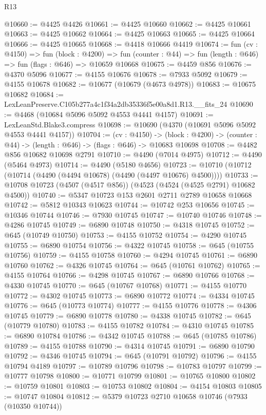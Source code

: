 \begin{lexlean}{R13}
\begin{coremodule}
@10660 := @4425 @4426
@10661 := @4425 @10660
@10662 := @4425 @10661
@10663 := @4425 @10662
@10664 := @4425 @10663
@10665 := @4425 @10664
@10666 := @4425 @10665
@10668 := @4418 @10666 @4419
@10674 := fun (cv : @4150) =>
  fun (block : @4200) =>
  fun (counter : @44) => fun (length : @646) => fun (flags : @646) => @10659 @10668
@10675 := @4459 @856
@10676 := @4370 @5096
@10677 := @4155 @10676
@10678 := @7933 @5092
@10679 := @4155 @10678
@10682 := @10677 (@10679 (@4673 @4978))
@10683 := @10675 @10682
@10684 := LexLeanPreserve.C105b277a4c1f34a2db35336f5e00a8d1.R13.__fits_24
@10690 := @4468 (@10684 @5096 @5092 @4553 @4441 @4157)
@10691 := LexLeanStd.Blake3.compress
@10698 := @10690 (@4370 (@10691 @5096 @5092 @4553 @4441 @4157))
@10704 := (cv : @4150) ->
  (block : @4200) -> (counter : @44) -> (length : @646) -> (flags : @646) -> @10683 @10698
@10708 := @4482 @856 @10682 @10698 @2791
@10710 := @4490 (@7014 @4975)
@10712 := @4490 (@5464 @4973)
@10714 := @4490 (@5180 @4656)
@10723 := @10710 (@10712 (@10714 (@4490 (@4494 @10678) (@4490 (@4497 @10676) @4500))))
@10733 := @10708 @10723 (@4507 (@4517 @856)) (@4523 (@4524 (@4525 @2791) @10682 @4500))
@10740 := @5347 @10723 @153 @2601 @2711 @2789 @10658 @10668
@10742 := @5812 @10343 @10623
@10744 := @10742 @253 @10656
@10745 := @10346 @10744
@10746 := @7930 @10745
@10747 := @10740 @10746
@10748 := @4286 @10745
@10749 := @6890 @10748
@10750 := @4318 @10745
@10752 := @645 (@10749 @10750)
@10753 := @4155 @10752
@10754 := @4290 @10745
@10755 := @6890 @10754
@10756 := @4322 @10745
@10758 := @645 (@10755 @10756)
@10759 := @4155 @10758
@10760 := @4294 @10745
@10761 := @6890 @10760
@10762 := @4326 @10745
@10764 := @645 (@10761 @10762)
@10765 := @4155 @10764
@10766 := @4298 @10745
@10767 := @6890 @10766
@10768 := @4330 @10745
@10770 := @645 (@10767 @10768)
@10771 := @4155 @10770
@10772 := @4302 @10745
@10773 := @6890 @10772
@10774 := @4334 @10745
@10776 := @645 (@10773 @10774)
@10777 := @4155 @10776
@10778 := @4306 @10745
@10779 := @6890 @10778
@10780 := @4338 @10745
@10782 := @645 (@10779 @10780)
@10783 := @4155 @10782
@10784 := @4310 @10745
@10785 := @6890 @10784
@10786 := @4342 @10745
@10788 := @645 (@10785 @10786)
@10789 := @4155 @10788
@10790 := @4314 @10745
@10791 := @6890 @10790
@10792 := @4346 @10745
@10794 := @645 (@10791 @10792)
@10796 := @4155 @10794 @4189
@10797 := @10789 @10796
@10798 := @10783 @10797
@10799 := @10777 @10798
@10800 := @10771 @10799
@10801 := @10765 @10800
@10802 := @10759 @10801
@10803 := @10753 @10802
@10804 := @4154 @10803
@10805 := @10747 @10804
@10812 := @5379 @10723 @2710 @10658 @10746 (@7933 (@10350 @10744))

\end{coremodule}
\end{lexlean}
